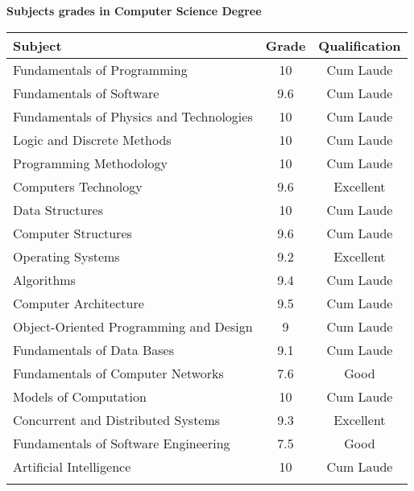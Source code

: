 \documentclass[10pt,a4paper,sans]{moderncv} %
\begin{document}
	\centerline{\textbf{Subjects grades in Computer Science Degree}}
	\kern 2mm
	\centering \begin{tabular}{lcc}
		\toprule
		\textbf{Subject} & \textbf{ Grade } & \textbf{ Qualification}     \\
		\midrule
		Fundamentals of Programming                   & 10   & Cum Laude  \\ 
		Fundamentals of Software                      & 9.6  & Cum Laude  \\
		Fundamentals of Physics and Technologies      & 10   & Cum Laude  \\ 
		Logic and Discrete Methods                    & 10   & Cum Laude  \\
		Programming Methodology                       & 10   & Cum Laude  \\
		Computers Technology                          & 9.6  & Excellent   \\
		Data Structures                               & 10   & Cum Laude  \\
		Computer Structures                           & 9.6  & Cum Laude  \\
		Operating Systems                             & 9.2  & Excellent   \\
		Algorithms                                    & 9.4  & Cum Laude  \\
		Computer Architecture                         & 9.5  & Cum Laude  \\
		Object-Oriented Programming and Design        & 9    & Cum Laude  \\    
		Fundamentals of Data Bases                    & 9.1  & Cum Laude  \\ 
		Fundamentals of Computer Networks             & 7.6  & Good       \\
		Models of Computation                         & 10   & Cum Laude  \\
		Concurrent and Distributed Systems            & 9.3  & Excellent   \\
		Fundamentals of Software Engineering          & 7.5  & Good       \\
		Artificial Intelligence                       & 10   & Cum Laude  \\
		\bottomrule
		\\
	\end{tabular}
	
	\pagebreak
	
\end{document}
